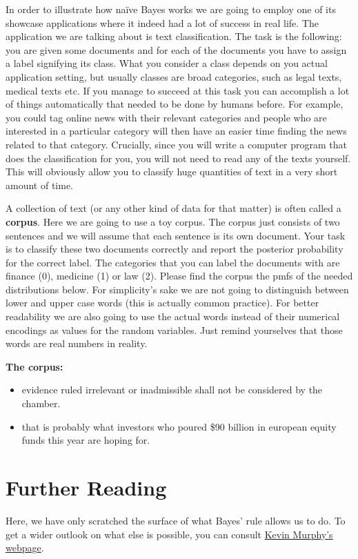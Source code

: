 In order to illustrate how na\"ive Bayes works we are going to employ one of its showcase applications where it indeed had
a lot of success in real life. The application we are talking about is text classification. The task is the following: you
are given some documents and for each of the documents you have to assign a label signifying its class. What you consider
a class depends on you actual application setting, but usually classes are broad categories, such as legal texts, medical
texts etc. If you manage to succeed at this task you can accomplish a lot of things automatically that needed to be done
by humans before. For example, you could tag online news with their relevant categories and people who are interested in
a particular category will then have an easier time finding the news related to that category. Crucially, since you will
write a computer program that does the classification for you, you will not need to read any of the texts yourself. This 
will obviously allow you to classify huge quantities of text in a very short amount of time.

\begin{Exercise}
A collection of text (or any other kind of data for that matter) is often called a \textbf{corpus}. Here we are going to
use a toy corpus. The corpus just consists of two sentences and we will assume that each sentence is its own document.
Your task is to classify these two documents correctly and report the posterior probability for the correct label. 
The categories that you can label the documents with are
finance (0), medicine (1) or law (2). Please find the corpus the pmfs of the needed distributions below. For simplicity's
sake we are not going to distinguish between lower and upper case words (this is actually common practice). For better 
readability we are also going to use the actual words instead of their numerical encodings as values for the random 
variables. Just remind yourselves that those words are real numbers in reality.
\end{Exercise}

\textbf{The corpus:}
\begin{itemize}
\item evidence ruled irrelevant or inadmissible shall not be considered by the chamber.
\item that is probably what investors who poured \$90 billion in european equity funds this year are hoping for.
\end{itemize}

\section*{Further Reading}
Here, we have only scratched the surface of what Bayes' rule allows us to do. To get a wider outlook on what else is possible,
you can consult \href{http://www.cs.ubc.ca/~murphyk/Bayes/bayesrule.html}{Kevin Murphy's webpage}.

